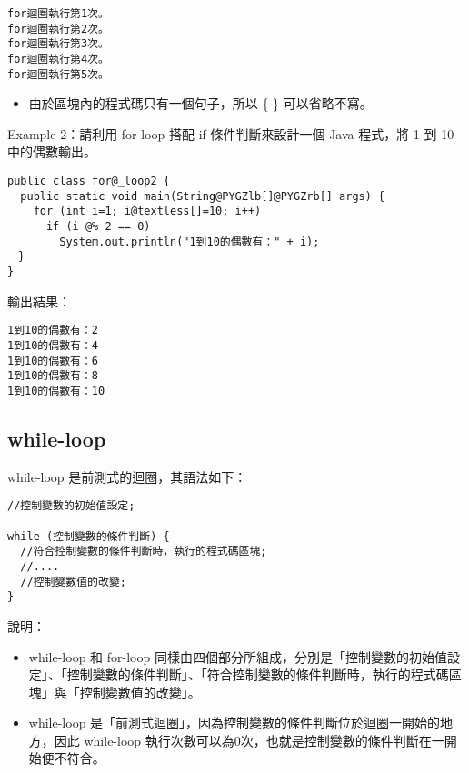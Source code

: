 \documentclass[a4paper,12pt,english]{sphinxmanual}
\begin{document}
\begin{Verbatim}[commandchars=@\[\]]
for迴圈執行第1次。
for迴圈執行第2次。
for迴圈執行第3次。
for迴圈執行第4次。
for迴圈執行第5次。
\end{Verbatim}
\begin{itemize}
\item {} 
由於區塊內的程式碼只有一個句子，所以 \{ \} 可以省略不寫。

\end{itemize}

Example 2：請利用 for-loop 搭配 if 條件判斷來設計一個 Java 程式，將 1 到 10 中的偶數輸出。

\begin{Verbatim}[commandchars=@\[\]]
public class for@_loop2 {
  public static void main(String@PYGZlb[]@PYGZrb[] args) {
    for (int i=1; i@textless[]=10; i++)
      if (i @% 2 == 0)
        System.out.println("1到10的偶數有：" + i);
　}
}
\end{Verbatim}

輸出結果：

\begin{Verbatim}[commandchars=@\[\]]
1到10的偶數有：2
1到10的偶數有：4
1到10的偶數有：6
1到10的偶數有：8
1到10的偶數有：10
\end{Verbatim}


\subsection{while-loop}
\label{java_loop:while-loop}
while-loop 是前測式的迴圈，其語法如下：

\begin{Verbatim}[commandchars=@\[\]]
//控制變數的初始值設定;

while (控制變數的條件判斷) {
  //符合控制變數的條件判斷時，執行的程式碼區塊;
  //....
  //控制變數值的改變;
}
\end{Verbatim}

說明：
\begin{itemize}
\item {} 
while-loop 和 for-loop 同樣由四個部分所組成，分別是「控制變數的初始值設定」、「控制變數的條件判斷」、「符合控制變數的條件判斷時，執行的程式碼區塊」與「控制變數值的改變」。

\item {} 
while-loop 是「前測式迴圈」，因為控制變數的條件判斷位於迴圈一開始的地方，因此 while-loop 執行次數可以為0次，也就是控制變數的條件判斷在一開始便不符合。

\end{itemize}
\end{document}
